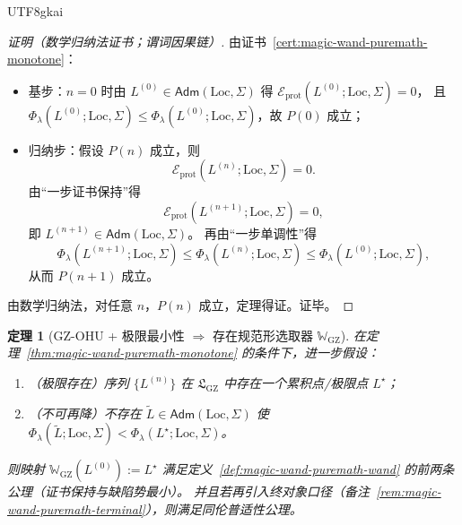 \documentclass[12pt]{article}
\newtheorem{theorem}{定理}[section]
\newcommand{\GZLS}{\ensuremath{\mathfrak{L}_{\mathrm{GZ}}}}
\begin{document}
\begin{CJK*}{UTF8}{gkai}
\begin{proof}[证明（数学归纳法证书；谓词因果链）]
由证书~\ref{cert:magic-wand-puremath-monotone}：
\begin{itemize}
  \item 基步：$n=0$ 时由 $L^{(0)}\in\mathsf{Adm}(\mathrm{Loc},\Sigma)$ 得 $\mathcal{E}_{\mathrm{prot}}(L^{(0)};\mathrm{Loc},
    \Sigma)=0$，
  且 $\Phi_\lambda(L^{(0)};\mathrm{Loc},\Sigma)\le \Phi_\lambda(L^{(0)};\mathrm{Loc},\Sigma)$，故 $P(0)$ 成立；
  \item 归纳步：假设 $P(n)$ 成立，则
  \[
    \mathcal{E}_{\mathrm{prot}}(L^{(n)};\mathrm{Loc},\Sigma)=0.
  \]
  由“一步证书保持”得
  \[
    \mathcal{E}_{\mathrm{prot}}(L^{(n+1)};\mathrm{Loc},\Sigma)=0,
  \]
  即 $L^{(n+1)}\in\mathsf{Adm}(\mathrm{Loc},\Sigma)$。
  再由“一步单调性”得
  \[
    \Phi_\lambda(L^{(n+1)};\mathrm{Loc},\Sigma)\le \Phi_\lambda(L^{(n)};\mathrm{Loc},\Sigma)\le \Phi_\lambda(L^{(0)};
      \mathrm{Loc},\Sigma),
  \]
  从而 $P(n+1)$ 成立。
\end{itemize}
由数学归纳法，对任意 $n$，$P(n)$ 成立，定理得证。证毕。
\end{proof}

\begin{theorem}[GZ-OHU + 极限最小性 $\Rightarrow$ 存在规范形选取器 $\mathbb{W}_{\mathrm{GZ}}$]
\label{thm:magic-wand-puremath-existence}
在定理~\ref{thm:magic-wand-puremath-monotone} 的条件下，进一步假设：
\begin{enumerate}
  \item （极限存在）序列 $\{L^{(n)}\}$ 在 $\GZLS$ 中存在一个累积点/极限点 $L^\star$；
  \item （不可再降）不存在 $\widetilde L\in\mathsf{Adm}(\mathrm{Loc},\Sigma)$ 使
  $\Phi_\lambda(\widetilde L;\mathrm{Loc},\Sigma)<\Phi_\lambda(L^\star;\mathrm{Loc},\Sigma)$。
\end{enumerate}
则映射 $\mathbb{W}_{\mathrm{GZ}}(L^{(0)}):=L^\star$ 满足定义~\ref{def:magic-wand-puremath-wand} 的前两条公理（证书保持与缺陷势最小）。
并且若再引入终对象口径（备注~\ref{rem:magic-wand-puremath-terminal}），则满足同伦普适性公理。
\end{theorem}


\end{CJK*}
\end{document}
